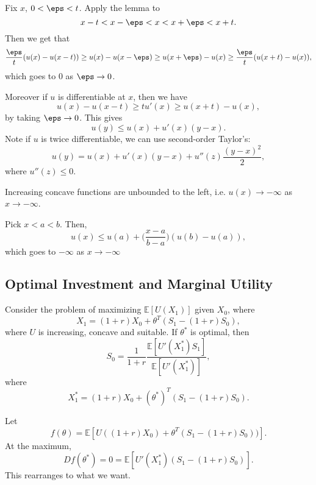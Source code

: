\documentclass[12pt]{article}
\begin{document}
\begin{proofbox}
	Fix $x$, $0 < \eps < t$. Apply the lemma to
	\[
	x-t < x - \eps < x < x + \eps < x + t.
	\]
	Then we get that
	\[
	\frac{\eps}{t} (u(x) - u(x-t)) \geq u(x) - u(x-\eps) \geq u(x+\eps)-u(x) \geq \frac{\eps}{t} (u(x+t) - u(x)),
	\]
	which goes to $0$ as $\eps \to 0$.

	Moreover if $u$ is differentiable at $x$, then we have
	\[
	u(x) - u(x-t) \geq t u'(x) \geq u(x+t) - u(x),
	\]
	by taking $\eps \to 0$. This gives
	\[
	u(y) \leq u(x) + u'(x) (y-x).
	\]
	Note if $u$ is twice differentiable, we can use second-order Taylor's:
	\[
	u(y) = u(x) + u'(x) (y-x) + u''(z) \frac{(y-x)^2}{2},
	\]
	where $u''(z) \leq 0$.
\end{proofbox}

\begin{theorem}
	Increasing concave functions are unbounded to the left, i.e. $u(x) \to -\infty$ as $x \to -\infty$.
\end{theorem}

\begin{proofbox}
	Pick $x < a < b$. Then,
	\[
	u(x) \leq u(a) + \biggl( \frac{x-a}{b-a} \biggr) (u(b) - u(a)),
	\]
	which goes to $-\infty$ as $x \to -\infty$
\end{proofbox}

\subsection{Optimal Investment and Marginal Utility}
\label{sub:optimal_invest}

\begin{theorem}
	Consider the problem of maximizing $\mathbb{E}[U(X_1)]$ given $X_0$, where
	\[
		X_1 = (1+r)X_0 + \theta^{T}(S_1 - (1+r)S_0),
	\]
	where $U$ is increasing, concave and suitable. If $\theta^{\ast}$ is optimal, then
	\[
	S_0 = \frac{1}{1+r} \frac{\mathbb{E}[U'(X_1^{\ast})S_1]}{\mathbb{E}[U'(X_1^{\ast})]},
	\]
	where
	\[
	X_1^{\ast} = (1+r)X_0 + (\theta^{\ast})^{T}(S_1 - (1+r)S_0).
	\]
\end{theorem}


\begin{proofbox}
	Let 
	\[
	f(\theta) = \mathbb{E}[U((1+r)X_0) + \theta^{T}(S_1-(1+r)S_0))].
	\]
	At the maximum,
	\[
	Df(\theta^{\ast}) = 0 = \mathbb{E}[U'(X_1^{\ast})(S_1-(1+r)S_0)].
	\]
	This rearranges to what we want.
\end{proofbox}

\newpage
\end{document}
